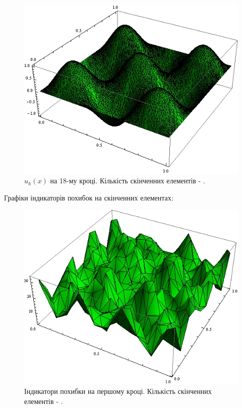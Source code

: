 \begin{figure}[H]
	\centering
    \includegraphics[scale=0.7]{problem1/my/solutions/18}
    \caption{$u_h(x)$ на 18-му кроці. Кількість скінченних елементів - .}
    \label{fig:p1_solution18}
\end{figure}
%
\clearpage
Графіки індикаторів похибок на скінченних елементах:
%
\begin{figure}[H]
	\centering
    \includegraphics[scale=0.8]{problem1/my/AEE/1}
    \caption{Індикатори похибки на першому кроці. Кількість скінченних елементів - .}
    \label{fig:p1_aee1}
\end{figure}

